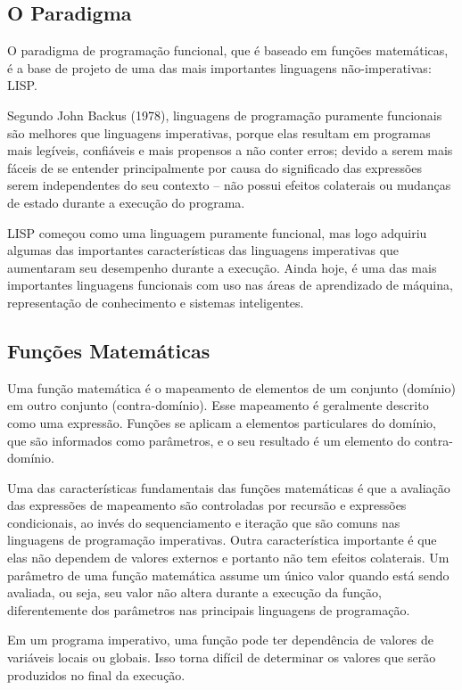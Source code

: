 \documentclass[a4paper, twoside, 12pt]{article}
\begin{document}
\subsection{O Paradigma}

O paradigma de programação funcional, que é baseado em funções matemáticas, é a base de projeto de uma das mais importantes linguagens não-imperativas: LISP.

Segundo John Backus (1978), linguagens de programação puramente funcionais são melhores que linguagens imperativas, porque elas resultam em programas mais legíveis, confiáveis e mais propensos a não conter erros; devido a serem mais fáceis de se entender principalmente por causa do significado das expressões serem independentes do seu contexto -- não possui efeitos colaterais ou mudanças de estado durante a execução do programa.

LISP começou como uma linguagem puramente funcional, mas logo adquiriu algumas das importantes características das linguagens imperativas que aumentaram seu desempenho durante a execução. Ainda hoje, é uma das mais importantes linguagens funcionais com uso nas áreas de aprendizado de máquina, representação de conhecimento e sistemas inteligentes.

\subsection{Funções Matemáticas}

Uma função matemática é o mapeamento de elementos de um conjunto (domínio) em outro conjunto (contra-domínio). Esse mapeamento é geralmente descrito como uma expressão. Funções se aplicam a elementos particulares do domínio, que são informados como parâmetros, e o seu resultado é um elemento do contra-domínio.

Uma das características fundamentais das funções matemáticas é que a avaliação das expressões de mapeamento são controladas por recursão e expressões condicionais, ao invés do sequenciamento e iteração que são comuns nas linguagens de programação imperativas. Outra característica importante é que elas não dependem de valores externos e portanto não tem efeitos colaterais. Um parâmetro de uma função matemática assume um único valor quando está sendo avaliada, ou seja, seu valor não altera durante a execução da função, diferentemente dos parâmetros nas principais linguagens de programação.

Em um programa imperativo, uma função pode ter dependência de valores de variáveis locais ou globais. Isso torna difícil de determinar os valores que serão produzidos no final da execução.
\end{document}

